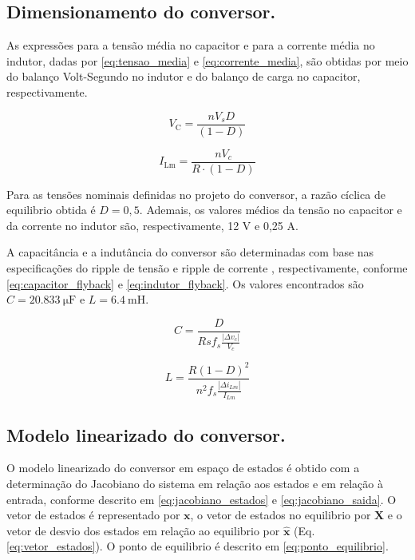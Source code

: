 \documentclass{article}
\begin{document}
\subsection{Dimensionamento do conversor.}

As expressões para a tensão média no capacitor e para a corrente média no indutor, dadas por \eqref{eq:tensao_media} e \eqref{eq:corrente_media}, são obtidas por meio do balanço Volt-Segundo no indutor e do balanço de carga no capacitor, respectivamente.

\begin{equation}
  V_\mathrm{C} = \frac{n V_s D}{(1 - D)}
  \label{eq:tensao_media}
\end{equation}

\begin{equation}
  I_\mathrm{Lm} = \frac{n V_c}{R \cdot (1-D)}
  \label{eq:corrente_media}
\end{equation}

Para as tensões nominais definidas no projeto do conversor, a razão cíclica de equilibrio obtida é \(D = 0,5\). Ademais, os valores médios da tensão no capacitor e da corrente no indutor são, respectivamente, 12 V e 0,25 A.

A capacitância e a indutância do conversor são determinadas com base nas especificações do ripple de tensão e ripple de corrente \cite{Erickson2020}, respectivamente, conforme \eqref{eq:capacitor_flyback} e \eqref{eq:indutor_flyback}. Os valores encontrados são \(C = 20.833\ \mathrm{\mu F}\) e \(L = 6.4\ \mathrm{mH} \).

\begin{equation}
  C = \frac{D}{Rs f_s \frac{|\Delta v_c|}{V_c}}
  \label{eq:capacitor_flyback}
\end{equation}

\begin{equation}
  L  =\frac{R(1-D)^2}{n^2 f_s \frac{|\Delta i_{Lm}|}{I_{Lm}}}
  \label{eq:indutor_flyback}
\end{equation}

\subsection{Modelo linearizado do conversor.}

O modelo linearizado do conversor em espaço de estados é obtido com a determinação do Jacobiano do sistema em relação aos estados e em relação à entrada, conforme descrito em \eqref{eq:jacobiano_estados} e \eqref{eq:jacobiano_saida}. O vetor de estados é representado por \(\mathbf{x}\), o vetor de estados no equilibrio por \(\mathbf{X}\) e o vetor de desvio dos estados em relação ao equilibrio por \(\mathbf{\hat{x}}\) (Eq. \eqref{eq:vetor_estados}).
O ponto de equilibrio é descrito em \eqref{eq:ponto_equilibrio}.
\end{document}
